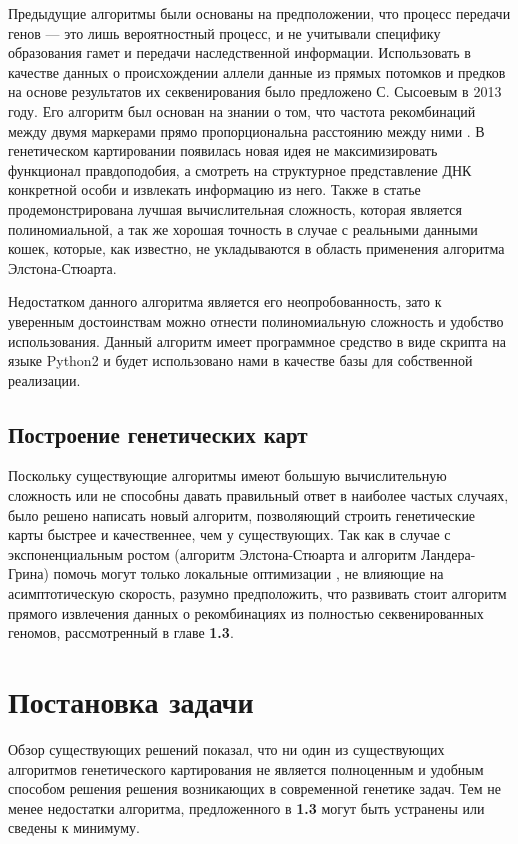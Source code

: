 \documentclass{matmex-diploma-custom}
\begin{document}
Предыдущие алгоритмы были основаны на предположении, что процесс
передачи генов --- это лишь вероятностный процесс, и не учитывали
специфику образования гамет и передачи наследственной
информации. Использовать в качестве данных о происхождении аллели
данные из прямых потомков и предков на основе результатов их
секвенирования было предложено С. Сысоевым в 2013 году. Его алгоритм
был основан на знании о том, что частота рекомбинаций между двумя
маркерами прямо пропорциональна расстоянию между ними \cite{sysoev}. В
генетическом картировании появилась новая идея не максимизировать
функционал правдоподобия, а смотреть на структурное представление ДНК
конкретной особи и извлекать информацию из него. Также в статье
\cite{sysoev} продемонстрирована лучшая вычислительная сложность,
которая является полиномиальной, а так же хорошая точность в случае с
реальными данными кошек, которые, как известно, не укладываются в
область применения алгоритма Элстона-Стюарта.

Недостатком данного алгоритма является его неопробованность, зато к
уверенным достоинствам можно отнести полиномиальную сложность и
удобство использования. Данный алгоритм имеет программное средство в
виде скрипта на языке Python2 и будет использовано нами в качестве
базы для собственной реализации.

\subsection*{Построение генетических карт}

Поскольку существующие алгоритмы имеют большую вычислительную
сложность или не способны давать правильный ответ в наиболее частых случаях,
было решено написать новый алгоритм, позволяющий строить генетические
карты быстрее и качественнее, чем у существующих. Так как в случае с
экспоненциальным ростом (алгоритм Элстона-Стюарта и алгоритм
Ландера-Грина) помочь могут только локальные оптимизации
\cite{o2001rapid, fishelson2002exact, fishelson2004optimizing}, не влияющие на
асимптотическую скорость, разумно предположить, что развивать стоит
алгоритм прямого извлечения данных о рекомбинациях из полностью
секвенированных геномов, рассмотренный в главе \textbf{1.3}.

\section{Постановка задачи}

Обзор существующих решений показал, что ни один из существующих
алгоритмов генетического картирования не является полноценным и
удобным способом решения решения возникающих в современной генетике
задач. Тем не менее недостатки алгоритма, предложенного в \textbf{1.3}
могут быть устранены или сведены к минимуму.
\end{document}
